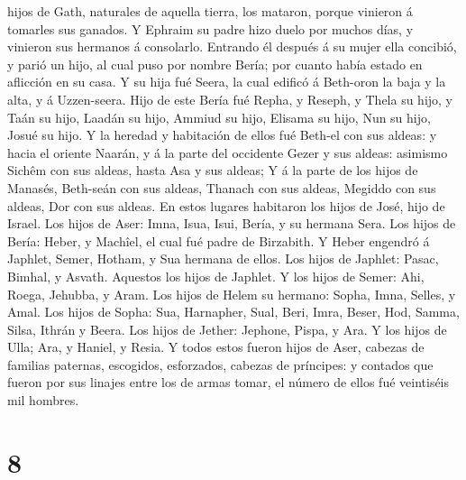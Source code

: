 hijos de Gath, naturales de aquella tierra, los mataron, porque vinieron
á tomarles sus ganados.  Y Ephraim su padre hizo duelo por
muchos días, y vinieron sus hermanos á consolarlo. 
Entrando él después á su mujer ella concibió, y parió un hijo, al cual
puso por nombre Bería; por cuanto había estado en aflicción en su casa.
 Y su hija fué Seera, la cual edificó á Beth-oron la baja y
la alta, y á Uzzen-seera.  Hijo de este Bería fué Repha, y
Reseph, y Thela su hijo, y Taán su hijo,  Laadán su hijo,
Ammiud su hijo, Elisama su hijo,  Nun su hijo, Josué su
hijo.  Y la heredad y habitación de ellos fué Beth-el con
sus aldeas: y hacia el oriente Naarán, y á la parte del occidente Gezer
y sus aldeas: asimismo Sichêm con sus aldeas, hasta Asa y sus aldeas;
 Y á la parte de los hijos de Manasés, Beth-seán con sus
aldeas, Thanach con sus aldeas, Megiddo con sus aldeas, Dor con sus
aldeas. En estos lugares habitaron los hijos de José, hijo de Israel.
 Los hijos de Aser: Imna, Isua, Isui, Bería, y su hermana
Sera.  Los hijos de Bería: Heber, y Machîel, el cual fué
padre de Birzabith.  Y Heber engendró á Japhlet, Semer,
Hotham, y Sua hermana de ellos.  Los hijos de Japhlet:
Pasac, Bimhal, y Asvath. Aquestos los hijos de Japhlet.  Y
los hijos de Semer: Ahi, Roega, Jehubba, y Aram.  Los hijos
de Helem su hermano: Sopha, Imna, Selles, y Amal.  Los
hijos de Sopha: Sua, Harnapher, Sual, Beri, Imra,  Beser,
Hod, Samma, Silsa, Ithrán y Beera.  Los hijos de Jether:
Jephone, Pispa, y Ara.  Y los hijos de Ulla; Ara, y Haniel,
y Resia.  Y todos estos fueron hijos de Aser, cabezas de
familias paternas, escogidos, esforzados, cabezas de príncipes: y
contados que fueron por sus linajes entre los de armas tomar, el número
de ellos fué veintiséis mil hombres.

\hypertarget{section-7}{%
\section{8}\label{section-7}}

